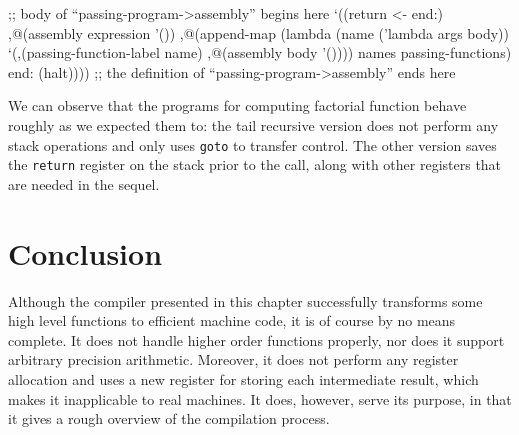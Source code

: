 \begin{Snippet}
    ;; body of ``passing-program->assembly'' begins here
    `((return <- end:)
      ,@(assembly expression '())
      ,@(append-map (lambda (name ('lambda args body))
		      `(,(passing-function-label name)
			,@(assembly body '())))
		    names passing-functions)
      end:
      (halt))))
    ;; the definition of ``passing-program->assembly'' ends here
\end{Snippet}

We can observe that the programs for computing factorial function
behave roughly as we expected them to: the tail recursive version
does not perform any stack operations and only uses \texttt{goto}
to transfer control. The other version saves the \texttt{return}
register on the stack prior to the call, along with other registers
that are needed in the sequel.

\section{Conclusion}

Although the compiler presented in this chapter successfully transforms
some high level functions to efficient machine code, it is of course
by no means complete. It does not handle higher order functions properly,
nor does it support arbitrary precision arithmetic. Moreover,
it does not perform any register allocation and uses a new register
for storing each intermediate result, which makes it inapplicable
to real machines. It does, however, serve its purpose, in that it
gives a rough overview of the compilation process.

